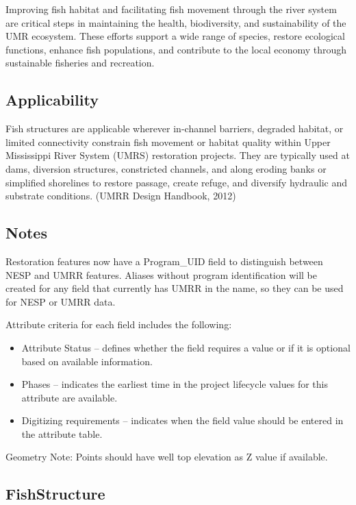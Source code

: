 \documentclass[
  letterpaper,
  DIV=11,
  numbers=noendperiod]{scrreprt}
\providecommand{\tightlist}{%
  \setlength{\itemsep}{0pt}\setlength{\parskip}{0pt}}
\begin{document}
Improving fish habitat and facilitating fish movement through the river
system are critical steps in maintaining the health, biodiversity, and
sustainability of the UMR ecosystem. These efforts support a wide range
of species, restore ecological functions, enhance fish populations, and
contribute to the local economy through sustainable fisheries and
recreation.

\subsection{Applicability}\label{applicability-3}

Fish structures are applicable wherever in-channel barriers, degraded
habitat, or limited connectivity constrain fish movement or habitat
quality within Upper Mississippi River System (UMRS) restoration
projects. They are typically used at dams, diversion structures,
constricted channels, and along eroding banks or simplified shorelines
to restore passage, create refuge, and diversify hydraulic and substrate
conditions. (UMRR Design Handbook, 2012)

\subsection{Notes}\label{notes-5}

Restoration features now have a Program\_UID field to distinguish
between NESP and UMRR features. Aliases without program identification
will be created for any field that currently has UMRR in the name, so
they can be used for NESP or UMRR data.

Attribute criteria for each field includes the following:

\begin{itemize}
\tightlist
\item
  Attribute Status -- defines whether the field requires a value or if
  it is optional based on available information.
\item
  Phases -- indicates the earliest time in the project lifecycle values
  for this attribute are available.
\item
  Digitizing requirements -- indicates when the field value should be
  entered in the attribute table.
\end{itemize}

Geometry Note: Points should have well top elevation as Z value if
available.

\subsection{FishStructure}\label{fishstructure}
\end{document}
